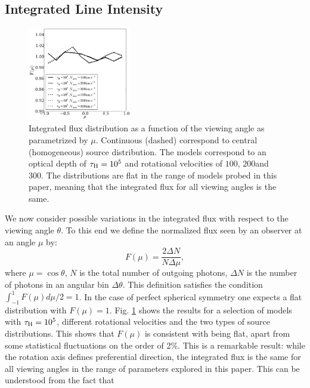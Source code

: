 \subsection{Integrated Line Intensity}
\label{sec:intlineint}
\begin{figure}
\begin{center}
\includegraphics[width=0.4\textwidth]{Figures/f5.pdf}
\end{center}
\caption{Integrated flux distribution as a function of the
viewing angle as parametrized by $\mu$. Continuous (dashed)
correspond to central (homogeneous) source distribution.
The models correspond to an optical depth of $\tau_{\rm
H}=10^5$ and rotational velocities of $100$\kms, $200$\kms and
$300$\kms. The distributions are flat in the range of models probed
in this paper, meaning that the integrated flux for all viewing
angles is the same.
\label{fig:muhisto}}
\end{figure}
We now consider possible variations in the integrated flux with
respect to the viewing angle $\theta$.
To this end we define the normalized flux seen by an observer at an
angle $\mu$ by:
\begin{equation}
F(\mu) = \frac{2\Delta N}{N\Delta \mu},
\end{equation}
%
where $\mu=\cos\theta$, $N$ is the total number of outgoing photons,
$\Delta N$ is the number of photons in an angular bin $\Delta
\theta$. This definition satisfies the condition
$\int_{-1}^{1}F(\mu)d\mu/2=1$. In the case of perfect spherical
symmetry one expects a flat distribution with $F(\mu)=1$.
Fig. \ref{fig:muhisto} shows the results for a selection of models
with $\tau_{\rm H}=10^{5}$, different rotational velocities and the two
types of source distributions. This shows that $F(\mu)$ is consistent with being flat, apart
from some statistical fluctuations on the order of 2\%.
This is a remarkable result: while the rotation axis defines preferential direction, the
integrated flux is the same for all viewing angles in the range of parameters explored in this paper. This can be understood from the fact that

